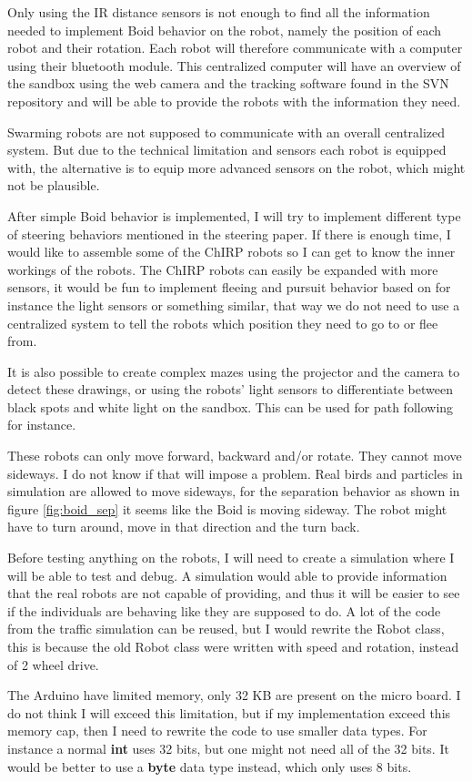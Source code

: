 Only using the IR distance sensors is not enough to find all the information needed to implement Boid behavior on the robot, namely the position of each robot and their rotation.
Each robot will therefore communicate with a computer using their bluetooth module.
This centralized computer will have an overview of the sandbox using the web camera and the tracking software found in the SVN repository and will be able to provide the robots with the information they need.

Swarming robots are not supposed to communicate with an overall centralized system. But due to the technical limitation and sensors each robot is equipped with, the alternative is to equip more advanced sensors on the robot, which might not be plausible.

After simple Boid behavior is implemented, I will try to implement different type of steering behaviors mentioned in the steering paper. If there is enough time, I would like to assemble some of the ChIRP robots so I can get to know the inner workings of the robots. The ChIRP robots can easily be expanded with more sensors, it would be fun to implement fleeing and pursuit behavior based on for instance the light sensors or something similar, that way we do not need to use a centralized system to tell the robots which position they need to go to or flee from.

It is also possible to create complex mazes using the projector and the camera to detect these drawings, or using the robots' light sensors to differentiate between black spots and white light on the sandbox. This can be used for path following for instance.

These robots can only move forward, backward and/or rotate. They cannot move sideways. I do not know if that will impose a problem. Real birds and particles in simulation are allowed to move sideways, for the separation behavior as shown in figure \ref{fig:boid_sep} it seems like the Boid is moving sideway. The robot might have to turn around, move in that direction and the turn back.

Before testing anything on the robots, I will need to create a simulation where I will be able to test and debug. A simulation would able to provide information that the real robots are not capable of providing, and thus it will be easier to see if the individuals are behaving like they are supposed to do. A lot of the code from the traffic simulation can be reused, but I would rewrite the Robot class, this is because the old Robot class were written with speed and rotation, instead of 2 wheel drive.

The Arduino have limited memory, only 32 KB are present on the micro board. I do not think I will exceed this limitation, but if my implementation exceed this memory cap, then I need to rewrite the code to use smaller data types. For instance a normal \textbf{int} uses 32 bits, but one might not need all of the 32 bits. It would be better to use a \textbf{byte} data type instead, which only uses 8 bits.

